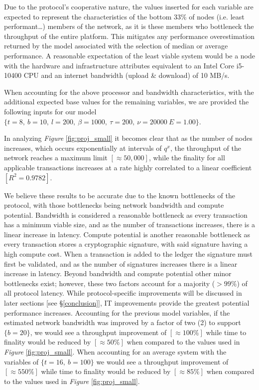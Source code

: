 Due to the protocol's cooperative nature, the values inserted for each variable are expected to represent the characteristics of the bottom 33\% of nodes (i.e. least performant…) members of the network, as it is these members who bottleneck the throughput of the entire platform. This mitigates any performance overestimation returned by the model associated with the selection of median or average performance. A reasonable expectation of the least viable system would be a node with the hardware and infrastructure attributes equivalent to an Intel Core i5-10400 CPU and an internet bandwidth (upload \& download) of 10 MB/s.

When accounting for the above processor and bandwidth characteristics, with the additional expected base values for the remaining variables, we are provided the following inputs for our model \(
\{
t = 8, \
b = 10, \ 
l = 200, \
\beta = 1000, \
\tau = 200, \
\nu = 20000 \
E = 1.00
\}
\).



In analyzing \textit{Figure} \ref{fig:proj_small} it becomes clear that as the number of nodes increases, which occurs exponentially at intervals of \(q^x\), the throughput of the network reaches a maximum limit \([\approx 50,000]\), while the finality for all applicable transactions increases at a rate highly correlated to a linear coefficient \([R^2 = 0.9782]\).

We believe these results to be accurate due to the known bottlenecks of the protocol, with those bottlenecks being network bandwidth and compute potential. Bandwidth is considered a reasonable bottleneck as every transaction has a minimum viable size, and as the number of transactions increases, there is a linear increase in latency. Compute potential is another reasonable bottleneck as every transaction stores a cryptographic signature, with said signature having a high compute cost. When a transaction is added to the ledger the signature must first be validated, and as the number of signatures increases there is a linear increase in latency. Beyond bandwidth and compute potential other minor bottlenecks exist; however, these two factors account for a majority (\(>99\% \)) of all protocol latency. While protocol-specific improvements will be discussed in later sections [see \S\ref{conclusion}], IT improvements provide the greatest potential performance increases. Accounting for the previous model variables, if the  estimated network bandwidth was improved by a factor of two (2) to support \(\{ b = 20\}\), we would see a throughput improvement of \([\approx100\%]\) while time to finality would be reduced by \([\approx50\%]\) when compared to the values used in \textit{Figure} \ref{fig:proj_small}. When accounting for an average system with the variables of \(\{
t = 16, \
b = 100 
\}\)  we would see a throughput improvement of \([\approx550\%]\) while time to finality would be reduced by \([\approx85\%]\) when compared to the values used in \textit{Figure} \ref{fig:proj_small}.

